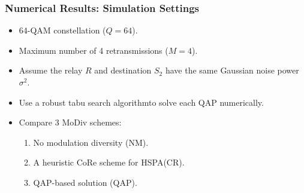 \documentclass{beamer}
\begin{document}
\begin{frame}
  \frametitle{Numerical Results: Simulation Settings}
  \begin{itemize}[<+->]
    \item 64-QAM constellation ($Q = 64$).
    \item Maximum number of 4 retransmissions ($M = 4$).
    \item Assume the relay $R$ and destination $S_2$ have the
    same Gaussian noise power $\sigma^2$.
    \item Use a robust tabu search algorithm\footnotemark to solve each QAP
    numerically.
    \item Compare 3 MoDiv schemes:
      \begin{enumerate}
        \item No modulation diversity (NM).
        \item A heuristic CoRe scheme for HSPA\footnotemark (CR).
        \item QAP-based solution (QAP).
      \end{enumerate}
  \end{itemize}
\end{frame}
\end{document}
